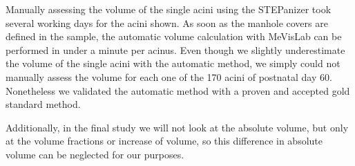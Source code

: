 \documentclass[%
	paper=a4,%
	abstract=true,%
	]{scrartcl}
\begin{document}
Manually assessing the volume of the single acini using the STEPanizer took several working days for the acini shown. As soon as the manhole covers are defined in the sample, the automatic volume calculation with MeVisLab can be performed in under a minute per acinus. Even though we slightly underestimate the volume of the single acini with the automatic method, we simply could not manually assess the volume for each one of the 170 acini of postnatal day 60. Nonetheless we validated the automatic method with a proven and accepted gold standard method.

Additionally, in the final study we will not look at the absolute volume, but only at the volume fractions or increase of volume, so this difference in absolute volume can be neglected for our purposes.
\end{document}
